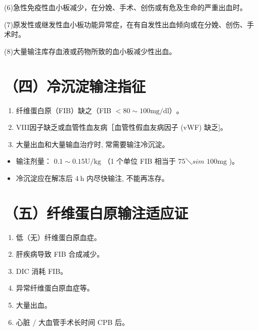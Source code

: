 \documentclass[10pt]{article}
\begin{document}
(6)急性免疫性血小板减少，在分娩、手术、创伤或有危及生命的严重出血时。

(7)原发性或继发性血小板功能异常症，在有自发性出血倾向或在分娩、创伤、手术时。

(8)大量输注库存血液或药物所致的血小板减少性出血。

\section*{（四）冷沉淀输注指征}
\begin{enumerate}
  \item 纤维蛋白原（FIB）缺之（FIB $<80 \sim 100 \mathrm{mg} / \mathrm{dl} ） 。$

  \item VIII因子缺乏或血管性血友病［血管性假血友病因子 (vWF) 缺乏]。

  \item 大量出血和大量输血治疗时, 常需要输注冷沉淀。

\end{enumerate}

\begin{itemize}
  \item 输注剂量： $0.1 \sim 0.15 \mathrm{U} / \mathrm{kg}$ （1 个单位 FIB 相当于 $75 ＼sim$ $100 \mathrm{mg}$ )。
  \item 冷沉淀应在解冻后 $4 \mathrm{~h}$ 内尽快输注, 不能再冻存。
\end{itemize}

\section*{（五）纤维蛋白原输注适应证}
\begin{enumerate}
  \item 低（无）纤维蛋白原血症。

  \item 肝疾病导致 FIB 合成减少。

  \item DIC 消耗 FIB。

  \item 异常纤维蛋白原血症等。

  \item 大量出血。

  \item 心脏 / 大血管手术长时间 CPB 后。

\end{enumerate}
\end{document}
